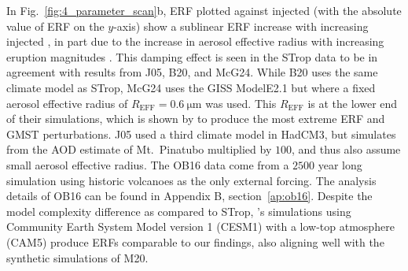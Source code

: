\documentclass[draft]{agujournal2019}
\begin{document}
  In Fig.~\ref{fig:4_parameter_scan}b, ERF plotted against injected  (with the
  absolute value of ERF on the \(y\)-axis) show a sublinear ERF increase with increasing
  injected , in part due to the increase in aerosol effective radius with
  increasing eruption magnitudes \cite{timmreck2009}. This damping effect is seen in the
  STrop data to be in agreement with results from J05, B20, and McG24. While B20 uses
  the same climate model as STrop, McG24 uses the GISS ModelE2.1 but where a fixed
  aerosol effective radius of \(R_{\text{EFF}}=\SI{0.6}{\micro\meter}\) was used. This
  \(R_{\text{EFF}}\) is at the lower end of their simulations, which is shown by
   to produce the most extreme ERF and GMST perturbations. J05 used a
  third climate model in HadCM3, but simulates from the AOD estimate of Mt.\ Pinatubo
  multiplied by \(100\), and thus also assume small aerosol effective radius. The OB16
  data come from a \(2500\) year long simulation using historic volcanoes as the only
  external forcing. The analysis details of OB16 can be found in Appendix B,
  section~\ref{ap:ob16}. Despite the model complexity difference as compared to STrop,
  's simulations using Community Earth System Model version 1
  (CESM1) with a low-top atmosphere (CAM5) produce ERFs comparable to our findings, also
  aligning well with the synthetic simulations of M20.
\end{document}
